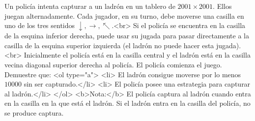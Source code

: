 Un policía intenta capturar a un ladrón en un tablero de $2001 \times 2001$. Ellos juegan alternadamente. Cada jugador, en su turno, debe moverse una casilla en uno de los tres sentidos $\downarrow, \rightarrow, \nwarrow$.<br>
Si el policía se encuentra en la casilla de la esquina inferior derecha, puede usar su jugada para pasar directamente a la casilla de la esquina superior izquierda (el ladrón no puede hacer esta jugada).<br>
Inicialmente el policía está en la casilla central y el ladrón está en la casilla vecina diagonal superior derecha al policía. El policía comienza el juego. Demuestre que:
<ol type="a">
  <li> El ladrón consigue moverse por lo menos $10000$ sin ser capturado.</li>
  <li> El policía posee una estrategia para capturar al ladrón.</li>
</ol>
<b>Nota:</b> El policía captura al ladrón cuando entra en la casilla en la que está el ladrón. Si el ladrón entra en la casilla del policía, no se produce captura.
